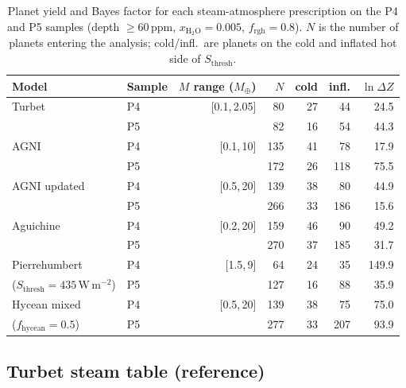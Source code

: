 \begin{table}[H]
    \centering
    \caption[Steam model comparison: planet yield and Bayes factor]{%
        Planet yield and Bayes factor for each steam-atmosphere prescription
        on the P4 and P5 samples (depth $\geq 60\,\mathrm{ppm}$, $x_{\mathrm{H_2O}}=0.005$,
        $f_{\mathrm{rgh}}=0.8$).  $N$ is the number of planets entering the
        \HZIED analysis; cold/infl.\ are planets on the cold and inflated
        hot side of $S_\mathrm{thresh}$.}
    \label{tab:steam_model_summary}
    \small
    \setlength{\tabcolsep}{5pt}
    \begin{tabular}{llrrrrr}
        \toprule
        Model & Sample & $M$ range ($M_\oplus$) & $N$ & cold & infl. & $\ln\Delta Z$ \\
        \midrule
        Turbet     & P4 & [0.1,\,2.05] &  80 & 27 & 44 &  24.5 \\
                   & P5 &              &  82 & 16 & 54 &  44.3 \\
        \midrule
        AGNI       & P4 & [0.1,\,10]   & 135 & 41 & 78 &  17.9 \\
                   & P5 &              & 172 & 26 &118 &  75.5 \\
        \midrule
        AGNI updated & P4 & [0.5,\,20] & 139 & 38 & 80 &  44.9 \\
                   & P5 &              & 266 & 33 &186 &  15.6 \\
        \midrule
        Aguichine  & P4 & [0.2,\,20]   & 159 & 46 & 90 &  49.2 \\
                   & P5 &              & 270 & 37 &185 &  31.7 \\
        \midrule
        Pierrehumbert & P4 & [1.5,\,9] &  64 & 24 & 35 & 149.9 \\
        ($S_\mathrm{thresh}=435\,\mathrm{W\,m^{-2}}$) & P5 & & 127 & 16 & 88 &  35.9 \\
        \midrule
        Hycean mixed & P4 & [0.5,\,20] & 139 & 38 & 75 &  75.0 \\
        ($f_\mathrm{hycean}=0.5$) & P5 &  & 277 & 33 &207 &  93.9 \\
        \bottomrule
    \end{tabular}
\end{table}


\subsection{Turbet steam table (reference)}
\label{ssec:turbet}

